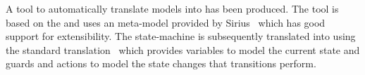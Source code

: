 
A tool to automatically translate \SCXML models into \UMLB has been produced. 
The tool is based on the \EMF and uses an \SCXML meta-model provided by Sirius~\cite{siriuswebsite} which has good support for extensibility. 
The \UMLB state-machine is subsequently translated into \EVENTB using the standard \UMLB translation~\cite{snook14:_b_statem} which provides variables to model the current state and guards and actions to model the state changes that transitions perform.

